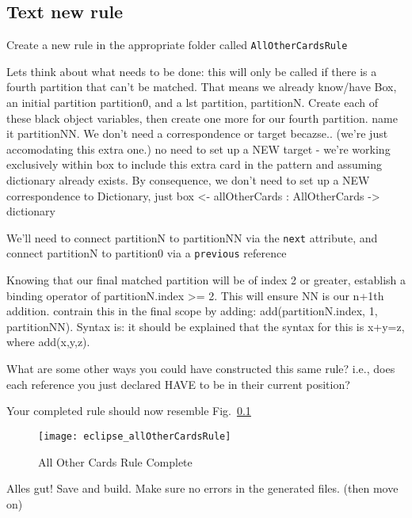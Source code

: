 \newpage
\hypertarget{allCards tex}{}
\subsection{Text new rule}
\texHeader

Create a new rule in the appropriate folder called \texttt{AllOtherCardsRule}

Lets think about what needs to be done: this will only be called if there is a fourth partition that can't be matched. That means we already know/have Box, an
initial partition partition0, and a lst partition, partitionN.  Create each of these black object variables, then create one more for our fourth partition.
name it partitionNN. We don't need a correspondence or target becazse.. (we're just accomodating this extra one.) no need to set up a NEW target - we're working exclusively within box to include this extra card in the pattern and assuming dictionary already exists. By
consequence, we don't need to set up a NEW correspondence to Dictionary, just box <- allOtherCards : AllOtherCards -> dictionary

We'll need to connect partitionN to partitionNN via the \texttt{next} attribute, and connect partitionN to partition0 via a \texttt{previous} reference

Knowing that our final matched partition will be of index 2 or greater, establish a binding operator of partitionN.index >= 2. This will ensure NN is our n+1th
addition. contrain this in the final scope by adding: add(partitionN.index, 1, partitionNN). Syntax is: it should be explained that the syntax for this is
x+y=z, where add(x,y,z).

What are some other ways you could have constructed this same rule? i.e., does each reference you just declared HAVE to be in their current position?

Your completed rule should now resemble Fig.~\ref{}

\begin{figure}[htbp]
\begin{center}
  \texttt{[image: eclipse\_allOtherCardsRule]}
  \caption{All Other Cards Rule Complete}
  \label{fig:allOtherCardsRule}
\end{center}
\end{figure}

Alles gut! Save and build. Make sure no errors in the generated files. (then move on)
